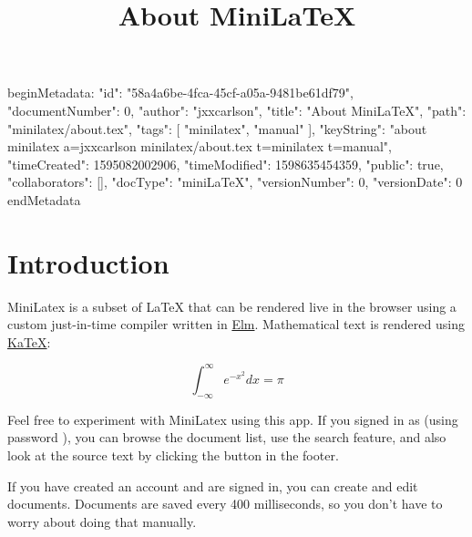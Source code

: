 beginMetadata:
{
    "id": "58a4a6be-4fca-45cf-a05a-9481be61df79",
    "documentNumber": 0,
    "author": "jxxcarlson",
    "title": "About MiniLaTeX",
    "path": "minilatex/about.tex",
    "tags": [
        "minilatex",
        "manual"
    ],
    "keyString": "about minilatex a=jxxcarlson minilatex/about.tex t=minilatex t=manual",
    "timeCreated": 1595082002906,
    "timeModified": 1598635454359,
    "public": true,
    "collaborators": [],
    "docType": "miniLaTeX",
    "versionNumber": 0,
    "versionDate": 0
}
endMetadata


\title{About MiniLaTeX}


\begin{mathmacro}
\newcommand{\bt}[1]{\bf{#1}}
\newcommand{\mca}[0]{\mathcal{A}}
\end{mathmacro}

\begin{textmacro}
\newcommand{\boss}{Phineas Fogg}
\newcommand{\hello}[1]{Hello \strong{#1}!}
\newcommand{\reverseconcat}[3]{#3#2#1}
\end{textmacro}

\maketitle


\tableofcontents

\section{Introduction}



MiniLatex is a subset of LaTeX that can be
rendered live in the browser using a custom just-in-time compiler written in \href{https://elm-lang.org}{Elm}.
Mathematical text is rendered using \href{https://katex.org}{KaTeX}:

$$
\int_{-\infty}^\infty e^{-x^2} dx = \pi
$$



 Feel free to
experiment with MiniLatex using this app.  If you signed in as 
 (using password ), you can browse
the document list, use the search feature, and also look at
the source text by clicking the  button in the footer.


 If you have created an account and  are signed in, you can create and edit documents.  Documents are saved every 400 milliseconds, so you don't have to worry about doing that manually. 


